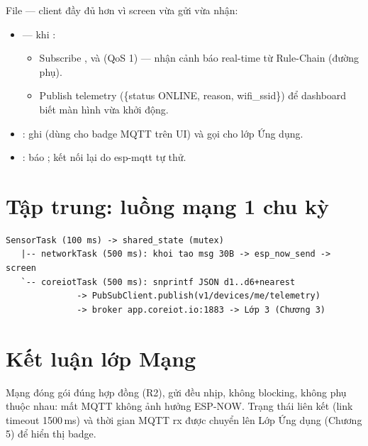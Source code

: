 File  — client đầy đủ hơn
vì screen vừa gửi vừa nhận:
\begin{itemize}
\item {} — khi :
  \begin{itemize}
  \item Subscribe ,
 và 
(QoS 1) — nhận cảnh báo real-time từ Rule-Chain (đường phụ).
  \item Publish telemetry  (\{status ONLINE, reason,
wifi\_ssid\}) để dashboard biết màn hình vừa khởi động.
  \end{itemize}
\item {}: ghi  (dùng cho
badge MQTT trên UI) và gọi  cho lớp Ứng dụng.
\item {}: báo ; kết nối
lại do esp-mqtt tự thử.
\end{itemize}

\section{Tập trung: luồng mạng 1 chu kỳ}

\begin{verbatim}
SensorTask (100 ms) -> shared_state (mutex)
   |-- networkTask (500 ms): khoi tao msg 30B -> esp_now_send -> screen
   `-- coreiotTask (500 ms): snprintf JSON d1..d6+nearest
              -> PubSubClient.publish(v1/devices/me/telemetry)
              -> broker app.coreiot.io:1883 -> Lớp 3 (Chương 3)
\end{verbatim}

\section{Kết luận lớp Mạng}

Mạng đóng gói đúng hợp đồng (R2), gửi đều nhịp, không blocking, không phụ
thuộc nhau: mất MQTT không ảnh hưởng ESP-NOW. Trạng thái liên kết (link timeout
1500\,ms) và thời gian MQTT rx được chuyển lên Lớp Ứng dụng (Chương 5) để hiển
thị badge.